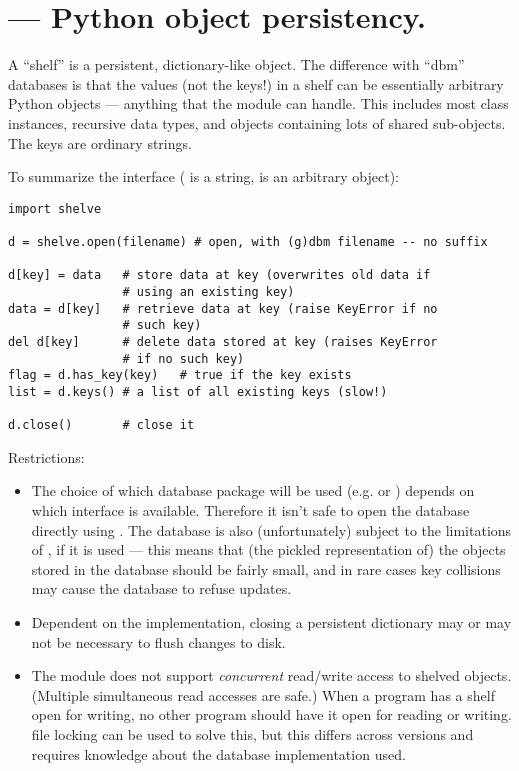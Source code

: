 \section{ ---
         Python object persistency.}



A ``shelf'' is a persistent, dictionary-like object.  The difference
with ``dbm'' databases is that the values (not the keys!) in a shelf
can be essentially arbitrary Python objects --- anything that the
 module can handle.  This includes most class instances,
recursive data types, and objects containing lots of shared
sub-objects.  The keys are ordinary strings.

To summarize the interface ( is a string,  is an
arbitrary object):

\begin{verbatim}
import shelve

d = shelve.open(filename) # open, with (g)dbm filename -- no suffix

d[key] = data   # store data at key (overwrites old data if
                # using an existing key)
data = d[key]   # retrieve data at key (raise KeyError if no
                # such key)
del d[key]      # delete data stored at key (raises KeyError
                # if no such key)
flag = d.has_key(key)   # true if the key exists
list = d.keys() # a list of all existing keys (slow!)

d.close()       # close it
\end{verbatim}
%
Restrictions:

\begin{itemize}

\item
The choice of which database package will be used (e.g.  or
)
depends on which interface is available.  Therefore it isn't safe to
open the database directly using .  The database is also
(unfortunately) subject to the limitations of , if it is used ---
this means that (the pickled representation of) the objects stored in
the database should be fairly small, and in rare cases key collisions
may cause the database to refuse updates.

\item
Dependent on the implementation, closing a persistent dictionary may
or may not be necessary to flush changes to disk.

\item
The  module does not support \emph{concurrent} read/write
access to shelved objects.  (Multiple simultaneous read accesses are
safe.)  When a program has a shelf open for writing, no other program
should have it open for reading or writing.  \UNIX{} file locking can
be used to solve this, but this differs across \UNIX{} versions and
requires knowledge about the database implementation used.

\end{itemize}


\begin{seealso}
\end{seealso}
